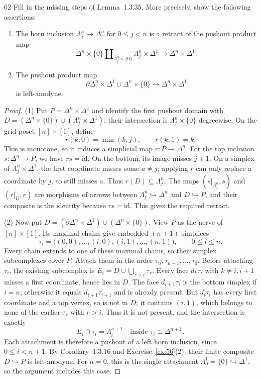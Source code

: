 \begin{exercise}{62}
Fill in the missing steps of Lemma~1.3.35. More precisely, show the following
assertions:
\begin{enumerate}[label=(\arabic*)]
\item The horn inclusion $\Lambda^n_j\to\Delta^n$ for $0\le j<n$ is a retract of the pushout product map
\[
 \Delta^n\times\{0\}\amalg_{\Lambda^n_j\times\{0\}}
 \Lambda^n_j\times\Delta^1\longrightarrow\Delta^n\times\Delta^1.
\]
\item The pushout product map
\[
 \partial\Delta^n\times\Delta^1\cup\Delta^n\times\{0\}
 \longrightarrow\Delta^n\times\Delta^1
\]
is left-anodyne.
\end{enumerate}

\begin{proof}
(1) Put $P=\Delta^n\times\Delta^1$ and identify the first
pushout domain with
$D=(\Delta^n\times\{0\})\cup(\Lambda^n_j\times\Delta^1)$;
their intersection is $\Lambda^n_j\times\{0\}$ degreewise.
On the grid poset $[n]\times[1]$, define
\[
 r(k,0)=\min(k,j),\qquad r(k,1)=k.
\]
This is monotone, so it induces a simplicial map $r\colon P\to\Delta^n$.
For the top inclusion $s\colon\Delta^n\to P$, we have $rs=\mathrm{id}$.
On the bottom, its image misses $j+1$.
On a simplex of $\Lambda^n_j\times\Delta^1$, the first
coordinate misses some $a\ne j$; applying $r$ can only
replace a coordinate by $j$, so still misses $a$.
Thus $r(D)\subseteq\Lambda^n_j$.
The maps $(s|_{\Lambda^n_j},s)$ and $(r|_D,r)$ are morphisms
of arrows between $\Lambda^n_j\hookrightarrow\Delta^n$ and
$D\hookrightarrow P$, and their composite is the identity
because $rs=\mathrm{id}$.
This gives the required retract.

(2) Now put
$D=(\partial\Delta^n\times\Delta^1)\cup(\Delta^n\times\{0\})$.
View $P$ as the nerve of $[n]\times[1]$.
Its maximal chains give embedded $(n+1)$-simplices
\[
 \tau_i=\bigl((0,0),\ldots,(i,0),(i,1),\ldots,(n,1)\bigr),
 \qquad 0\le i\le n.
\]
Every chain extends to one of these maximal chains, so their
simplex subcomplexes cover $P$.
Attach them in the order $\tau_n,\tau_{n-1},\ldots,\tau_0$.
Before attaching $\tau_i$, the existing subcomplex is
$E_i=D\cup\bigcup_{r>i}\tau_r$.
Every face $d_k\tau_i$ with $k\ne i,i+1$ misses a first
coordinate, hence lies in $D$.
The face $d_{i+1}\tau_i$ is the bottom simplex if $i=n$;
otherwise it equals $d_{i+1}\tau_{i+1}$ and is already present.
But $d_i\tau_i$ has every first coordinate and a top vertex,
so is not in $D$; it contains $(i,1)$, which belongs to none
of the earlier $\tau_r$ with $r>i$.
Thus it is not present, and the intersection is exactly
\[
 E_i\cap\tau_i=\Lambda^{n+1}_i
 \quad\text{inside }\tau_i\cong\Delta^{n+1}.
\]
Each attachment is therefore a pushout of a left horn inclusion,
since $0\le i<n+1$.
By Corollary~1.3.16 and Exercise~\ref{ex:56}(2), their finite
composite $D\hookrightarrow P$ is left-anodyne.
For $n=0$, this is the single attachment
$\Lambda^1_0=\{0\}\hookrightarrow\Delta^1$, so the argument
includes this case.
\end{proof}
\end{exercise}
